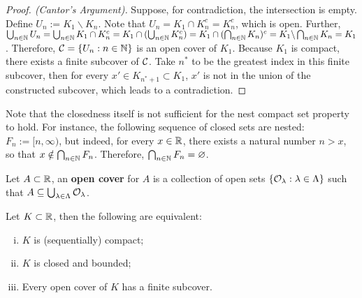 \documentclass[11pt]{article}
\begin{document}
	\begin{proof}[Proof. (Cantor's Argument)]
		Suppose, for contradiction, the intersection is empty. Define $U_n := K_1 \backslash K_n$. Note that $U_n = K_1 \cap K_n^c = K_n^c$, which is open. Further, $\bigcup_{n \in \mathbb{N}} U_n = \bigcup_{n \in \mathbb{N}} K_1 \cap K_n^c = K_1 \cap (\bigcup_{n \in \mathbb{N}}K_n^c) = K_1 \cap (\bigcap_{n \in \mathbb{N}}K_n)^c = K_1 \backslash \bigcap_{n \in \mathbb{N}}K_n = K_1$. Therefore, $\mathcal{{C}} = \{U_n: n \in \mathbb{N}\}$ is an open cover of $K_1$. Because $K_1$ is compact, there exists a finite subcover of $\mathcal{{C}}$. Take $n^*$ to be the greatest index in this finite subcover, then for every $x' \in K_{n^*+1} \subset K_1$, $x'$ is not in the union of the constructed subcover, which leads to a contradiction.
	\end{proof}
	
	\begin{example}
		Note that the closedness itself is not sufficient for the nest compact set property to hold. For instance, the following sequence of closed sets are nested: $F_n := [n, \infty)$, but indeed, for every $x \in \mathbb{R}$, there exists a natural number $n > x$, so that $x \notin \bigcap_{n \in \mathbb{N}} F_n$. Therefore, $\bigcap_{n \in \mathbb{N}} F_n = \varnothing$.
	\end{example}
	
	\begin{definition}
		Let $A \subset \mathbb{R}$, an \textbf{open cover} for $A$ is a collection of open sets $\{\mathcal{{O}}_\lambda: \lambda \in \Lambda\}$ such that $A \subseteq \bigcup_{\lambda \in \Lambda} \mathcal{{O}}_\lambda$.
	\end{definition}
	
	\begin{theorem}
		Let $K \subset \mathbb{R}$, then the following are equivalent:
		\begin{enumerate}[(i)]
			\item $K$ is (sequentially) compact;
			\item $K$ is closed and bounded;
			\item Every open cover of $K$ has a finite subcover.
		\end{enumerate}
	\end{theorem}
	
\end{document}
